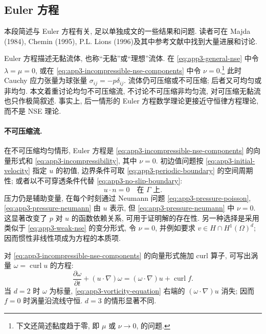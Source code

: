 \subsection*{Euler 方程}

本段简述与 Euler 方程有关, 足以单独成文的一些结果和问题. 读者可在 Majda (1984), Chemin (1995), P.L. Lions (1996)及其中参考文献中找到大量进展和讨论.

Euler 方程描述无黏流体, 也称``无黏''或``理想''流体. 在 
\eqref{eq:app3-general-nse} 中令 $\lambda=\mu=0$, 或在 
\eqref{eq:app3-incompressible-nse-components} 中令 $\nu=0$.\footnote{下文还简述黏度趋于零, 即 $\mu$ 或 $\nu\to0$, 的问题.} 此时 Cauchy 应力张量为球张量 $\sigma_{ij}=-p\delta_{ij}$. 流体仍可压缩或不可压缩; 后者又可均匀或非均匀. 本文着重讨论均匀不可压缩流, 不讨论不可压缩非均匀流, 对可压缩无黏流也只作极简叙述. 事实上, 后一情形的 Euler 方程数学理论更接近守恒律方程理论, 而不是 NSE 理论.

\paragraph{不可压缩流.}
在不可压缩均匀情形, Euler 方程是 
\eqref{eq:app3-incompressible-nse-components} 的向量形式和 
\eqref{eq:app3-incompressibility}, 其中 $\nu=0$. 初边值问题按 
\eqref{eq:app3-initial-velocity} 指定 $u$ 的初值, 边界条件可取 
\eqref{eq:app3-periodic-boundary} 的空间周期性; 或者以不可穿透条件代替 
\eqref{eq:app3-no-slip-boundary}:
\begin{equation}
u\cdot n=0
\quad\text{在 }\Gamma\text{ 上}.
\label{eq:app3-euler-nonpenetration}
\end{equation}
压力仍是辅助变量, 在每个时刻通过 Neumann 问题 
\eqref{eq:app3-pressure-poisson}, 
\eqref{eq:app3-pressure-neumann} 由 $u$ 表示, 但 
\eqref{eq:app3-pressure-neumann} 中 $\nu=0$. 这显著改变了 $p$ 对 $u$ 的函数依赖关系, 可用于证明解的存在性. 另一种选择是采用类似于 
\eqref{eq:app3-weak-nse} 的变分形式, 令 $\nu=0$, 并例如要求 $v\in H\cap H^1(\Omega)^d$; 因而惯性非线性项成为方程的本质项.

对 
\eqref{eq:app3-incompressible-nse-components} 的向量形式施加 curl 算子, 可写出涡量 $\omega=\operatorname{curl}u$ 的方程:
\begin{equation}
\frac{\partial\omega}{\partial t}+(u\cdot\nabla)\omega
=(\omega\cdot\nabla)u+\operatorname{curl}f.
\label{eq:app3-vorticity-equation}
\end{equation}
当 $d=2$ 时 $\omega$ 为标量, 
\eqref{eq:app3-vorticity-equation} 右端的 $(\omega\cdot\nabla)u$ 消失; 因而 $f=0$ 时涡量沿流线守恒. $d=3$ 的情形显著不同.

